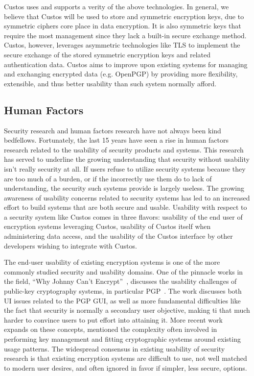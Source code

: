 Custos uses and supports a verity of the above technologies. In
general, we believe that Custos will be used to store and symmetric
encryption keys, due to symmetric ciphers core place in data
encryption. It is also symmetric keys that require the most management
since they lack a built-in secure exchange method. Custos, however,
leverages asymmetric technologies like TLS to implement the secure
exchange of the stored symmetric encryption keys and related
authentication data. Custos aims to improve upon existing systems for
managing and exchanging encrypted data (e.g. OpenPGP) by providing
more flexibility, extensible, and thus better usability than such
system normally afford.

\subsection{Human Factors}

Security research and human factors research have not always been kind
bedfellows. Fortunately, the last 15 years have seen a rise in human
factors research related to the usability of security products and
systems. This research has served to underline the growing
understanding that security without usability isn't really security at
all. If users refuse to utilize security systems because they are too
much of a burden, or if the incorrectly use them do to lack of
understanding, the security such systems provide is largely
useless. The growing awareness of usability concerns related to
security systems has led to an increased effort to build systems that
are both secure and usable. Usability with respect to a security
system like Custos comes in three flavors: usability of the end user
of encryption systems leveraging Custos, usability of Custos itself
when administering data access, and the usability of the Custos
interface by other developers wishing to integrate with Custos.

The end-user usability of existing encryption systems is one of the
more commonly studied security and usability domains. One of the
pinnacle works in the field, ``Why Johnny Can't
Encrypt''~\cite{Whitten1998, Whitten1998}, discusses the usability
challenges of public-key cryptography systems, in particular
PGP~\cite{openpgp}. The work discusses both UI issues related to the
PGP GUI, as well as more fundamental difficulties like the fact that
security is normally a secondary user objective, making ti that much
harder to convince users to put effort into attaining it. More recent
work~\cite{Sweikata2009, Furnell2006, Ibrahim2010} expands on these
concepts, mentioned the complexity often involved in performing key
management and fitting cryptographic systems around existing usage
patterns. The widespread consensus in existing usability of security
research is that existing encryption systems are difficult to use, not
well matched to modern user desires, and often ignored in favor if
simpler, less secure, options.

